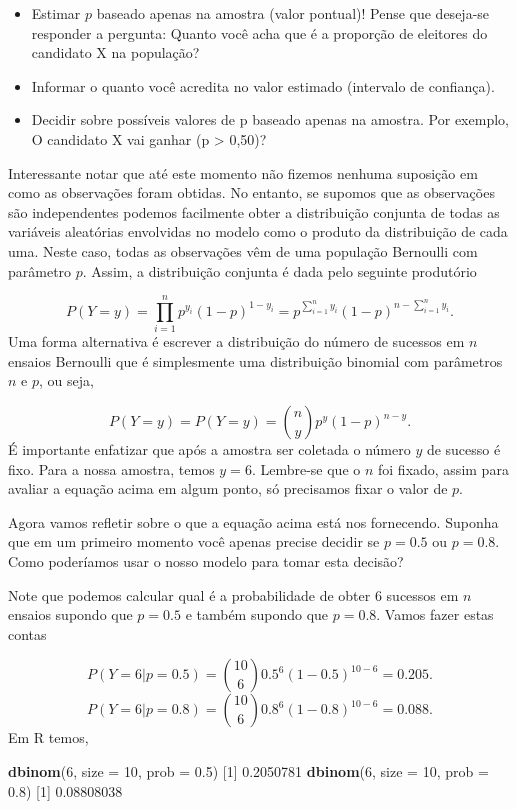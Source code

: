 \documentclass[10pt,a4paper]{book}
\newenvironment{Shaded}{\begin{snugshade}}{\end{snugshade}}
\newcommand{\KeywordTok}[1]{\textcolor[rgb]{0.13,0.29,0.53}{\textbf{#1}}}
\newcommand{\DataTypeTok}[1]{\textcolor[rgb]{0.13,0.29,0.53}{#1}}
\newcommand{\DecValTok}[1]{\textcolor[rgb]{0.00,0.00,0.81}{#1}}
\newcommand{\FloatTok}[1]{\textcolor[rgb]{0.00,0.00,0.81}{#1}}
\newcommand{\NormalTok}[1]{#1}
\providecommand{\tightlist}{%
  \setlength{\itemsep}{0pt}\setlength{\parskip}{0pt}}
\begin{document}
\begin{itemize}
\tightlist
\item
  Estimar \(p\) baseado apenas na amostra (valor pontual)! Pense que
  deseja-se responder a pergunta: Quanto você acha que é a proporção de
  eleitores do candidato X na população?
\item
  Informar o quanto você acredita no valor estimado (intervalo de
  confiança).
\item
  Decidir sobre possíveis valores de p baseado apenas na amostra. Por
  exemplo, O candidato X vai ganhar (p \textgreater{} 0,50)?
\end{itemize}

Interessante notar que até este momento não fizemos nenhuma suposição em
como as observações foram obtidas. No entanto, se supomos que as
observações são independentes podemos facilmente obter a distribuição
conjunta de todas as variáveis aleatórias envolvidas no modelo como o
produto da distribuição de cada uma. Neste caso, todas as observações
vêm de uma população Bernoulli com parâmetro \(p\). Assim, a
distribuição conjunta é dada pelo seguinte produtório

\[
P(Y = y) = \prod_{i=1}^{n} p^{y_i} (1-p)^{1-y_i} = p^{\sum_{i=1}^n y_i} (1-p)^{n - \sum_{i=1}^n y_i}.
\] Uma forma alternativa é escrever a distribuição do número de sucessos
em \(n\) ensaios Bernoulli que é simplesmente uma distribuição binomial
com parâmetros \(n\) e \(p\), ou seja,

\[
P(Y = y) = P(Y = y) = \binom{n}{y} p^y (1-p)^{n-y}.
\] É importante enfatizar que após a amostra ser coletada o número \(y\)
de sucesso é fixo. Para a nossa amostra, temos \(y = 6\). Lembre-se que
o \(n\) foi fixado, assim para avaliar a equação acima em algum ponto,
só precisamos fixar o valor de \(p\).

Agora vamos refletir sobre o que a equação acima está nos fornecendo.
Suponha que em um primeiro momento você apenas precise decidir se
\(p = 0.5\) ou \(p = 0.8\). Como poderíamos usar o nosso modelo para
tomar esta decisão?

Note que podemos calcular qual é a probabilidade de obter \(6\) sucessos
em \(n\) ensaios supondo que \(p = 0.5\) e também supondo que
\(p = 0.8\). Vamos fazer estas contas

\[
P(Y = 6 | p = 0.5) = \binom{10}{6} 0.5^6 (1-0.5)^{10-6} = 0.205.
\] \[
P(Y = 6 | p = 0.8) = \binom{10}{6} 0.8^6 (1-0.8)^{10-6} = 0.088.
\] Em R temos,

\begin{Shaded}
\begin{Highlighting}[]
\KeywordTok{dbinom}\NormalTok{(}\DecValTok{6}\NormalTok{, }\DataTypeTok{size =} \DecValTok{10}\NormalTok{, }\DataTypeTok{prob =} \FloatTok{0.5}\NormalTok{)}
\NormalTok{[}\DecValTok{1}\NormalTok{] }\FloatTok{0.2050781}
\KeywordTok{dbinom}\NormalTok{(}\DecValTok{6}\NormalTok{, }\DataTypeTok{size =} \DecValTok{10}\NormalTok{, }\DataTypeTok{prob =} \FloatTok{0.8}\NormalTok{)}
\NormalTok{[}\DecValTok{1}\NormalTok{] }\FloatTok{0.08808038}
\end{Highlighting}
\end{Shaded}
\end{document}
